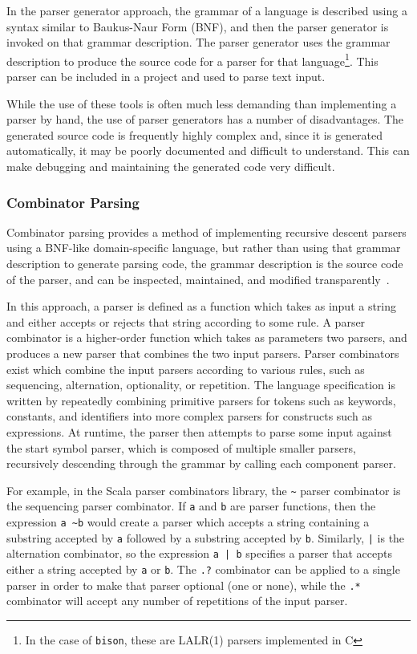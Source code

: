 In the parser generator approach, the grammar of a language is described using a syntax similar to Baukus-Naur Form (BNF), and then the parser generator is invoked on that grammar description. The parser generator uses the grammar description to produce the source code for a parser for that language\footnote{In the case of \texttt{bison}, these are LALR(1) parsers implemented in C}. This parser can be included in a project and used to parse text input. 

While the use of these tools is often much less demanding than implementing a parser by hand, the use of parser generators has a number of disadvantages. The generated source code is frequently highly complex and, since it is generated automatically, it may be poorly documented and difficult to understand. This can make debugging and maintaining the generated code very difficult.

\subsubsection{Combinator Parsing}

Combinator parsing provides a method of implementing recursive descent parsers using a BNF-like domain-specific language,  but rather than using that grammar description to generate parsing code, the grammar description is the source code of the parser, and can be inspected, maintained, and modified transparently~\cite{ghosh2010dsls,hofer2008polymorphic,moors2008parser}.

In this approach, a parser is defined as a function which takes as input a string and either accepts or rejects that string according to some rule. A parser combinator is a higher-order function which takes as parameters two parsers, and produces a new parser that combines the two input parsers. Parser combinators exist which combine the input parsers according to various rules, such as sequencing, alternation, optionality, or repetition. The language specification is written by repeatedly combining primitive parsers for tokens such as keywords, constants, and identifiers into more complex parsers for constructs such as expressions. At runtime, the parser then attempts to parse some input against the start symbol parser, which is composed of multiple smaller parsers, recursively descending through the grammar by calling each component parser.~\cite{moors2008parser,swierstra2001combinator,fokker1995functional,frost2008parser}

For example, in the Scala parser combinators library, the \texttt{\textasciitilde} parser combinator is the sequencing parser combinator. If \texttt{a} and \texttt{b} are parser functions, then the expression \texttt{a \textasciitilde b} would create a parser which accepts a string containing a substring accepted by \texttt{a} followed by a substring accepted by \texttt{b}. Similarly,  \texttt{|} is the alternation combinator, so the expression \texttt{a | b} specifies a parser that accepts either a string accepted by \texttt{a} or \texttt{b}.  The \texttt{.?} combinator can be applied to a single parser in order to make that parser optional (one or none), while the \texttt{.*} combinator will accept any number of repetitions of the input parser. 

